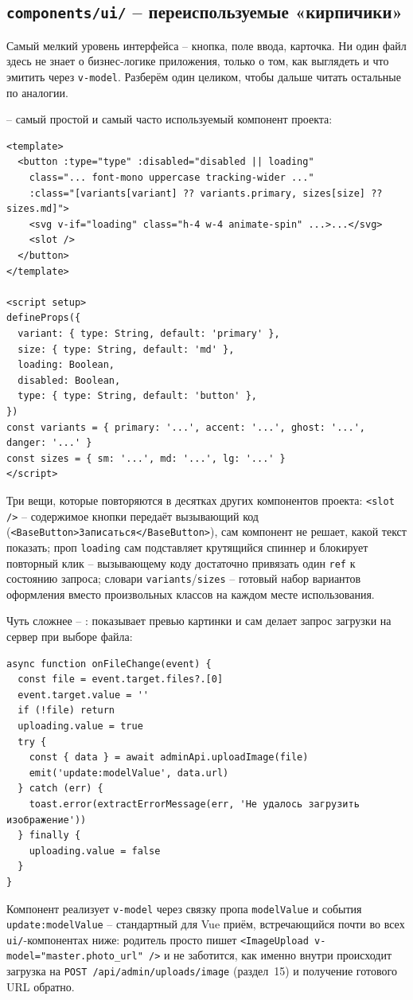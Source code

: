 \subsection{\texttt{components/ui/} -- переиспользуемые «кирпичики»}

Самый мелкий уровень интерфейса -- кнопка, поле ввода, карточка. Ни один
файл здесь не знает о бизнес-логике приложения, только о том, как
выглядеть и что эмитить через \texttt{v-model}. Разберём один целиком,
чтобы дальше читать остальные по аналогии.

 -- самый простой и
самый часто используемый компонент проекта:
\begin{verbatim}
<template>
  <button :type="type" :disabled="disabled || loading"
    class="... font-mono uppercase tracking-wider ..."
    :class="[variants[variant] ?? variants.primary, sizes[size] ?? sizes.md]">
    <svg v-if="loading" class="h-4 w-4 animate-spin" ...>...</svg>
    <slot />
  </button>
</template>

<script setup>
defineProps({
  variant: { type: String, default: 'primary' },
  size: { type: String, default: 'md' },
  loading: Boolean,
  disabled: Boolean,
  type: { type: String, default: 'button' },
})
const variants = { primary: '...', accent: '...', ghost: '...', danger: '...' }
const sizes = { sm: '...', md: '...', lg: '...' }
</script>
\end{verbatim}
Три вещи, которые повторяются в десятках других компонентов проекта:
\texttt{<slot />} -- содержимое кнопки передаёт вызывающий код
(\texttt{<BaseButton>Записаться</BaseButton>}), сам компонент не решает,
какой текст показать; проп \texttt{loading} сам подставляет крутящийся
спиннер и блокирует повторный клик -- вызывающему коду достаточно
привязать один \texttt{ref} к состоянию запроса; словари
\texttt{variants}/\texttt{sizes} -- готовый набор вариантов оформления
вместо произвольных классов на каждом месте использования.

Чуть сложнее -- :
показывает превью картинки и сам делает запрос загрузки на сервер при
выборе файла:
\begin{verbatim}
async function onFileChange(event) {
  const file = event.target.files?.[0]
  event.target.value = ''
  if (!file) return
  uploading.value = true
  try {
    const { data } = await adminApi.uploadImage(file)
    emit('update:modelValue', data.url)
  } catch (err) {
    toast.error(extractErrorMessage(err, 'Не удалось загрузить изображение'))
  } finally {
    uploading.value = false
  }
}
\end{verbatim}
Компонент реализует \texttt{v-model} через связку пропа
\texttt{modelValue} и события \texttt{update:modelValue} -- стандартный
для Vue приём, встречающийся почти во всех \texttt{ui/}-компонентах ниже:
родитель просто пишет \texttt{<ImageUpload v-model="master.photo_url" />}
и не заботится, как именно внутри происходит загрузка на
\texttt{POST /api/admin/uploads/image} (раздел~15) и получение готового
URL обратно.


